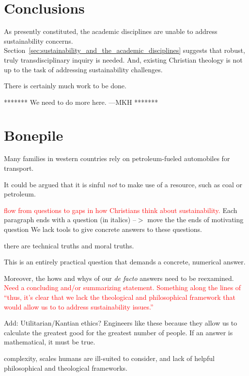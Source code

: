 \documentclass[12pt]{article}
\newcommand{\ins}[1]{\textcolor{red}{#1}}
\begin{document}
\section{Conclusions}
\label{sec:conclusions}

As presently constituted, the academic disciplines are unable to address sustainability concerns. 
Section~\ref{sec:sustainability_and_the_academic_disciplines} suggests that 
robust, truly transdisciplinary inquiry is needed.
And, existing Christian theology is not up to the task of addressing sustainability challenges.

There is certainly much work to be done.

******* We need to do more here. ---MKH *******


\section{Bonepile}


Many families in western countries rely on petroleum-fueled automobiles for transport.

It could be argued that it is sinful \emph{not} to make use of a resource, such as coal or petroleum. 

\ins{flow from questions to gaps in how Christians think about sustainability.}
Each paragraph ends with a question (in italics)
--$>$ move the the ends of motivating question
 We lack tools to give concrete answers to these questions.

there are technical truths and moral truths. 

This is an entirely practical question that demands a concrete, numerical answer.

Moreover, the hows and whys of our \emph{de facto} answers need to be reexamined.
\ins{Need a concluding and/or summarizing statement. Something along the lines of ``thus, it's clear that we lack the theological
and philosophical framework that would allow us to to address sustainability issues.''}

Add: Utilitarian/Kantian ethics? Engineers like these because they allow us to calculate the greatest good for the greatest number of people.
If an answer is mathematical, it must be true.


complexity, scales humans are ill-suited to consider, 
and lack of helpful philosophical and theological frameworks.
\end{document}
